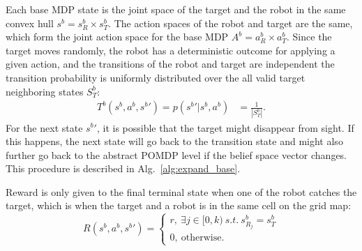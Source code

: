\documentclass[../main.tex]{subfiles}
\begin{document}
Each base MDP state is the joint space of the target and the robot in the same convex hull $s^b = s_R^b \times s_T^b$. The action spaces of the robot and target are the same, which form the joint action space for the base MDP $A^b = a_R^b \times a_T^b$. Since the target moves randomly, the robot has a deterministic outcome for applying a given action,
and the transitions of the robot and target are independent
the transition probability is uniformly distributed over the all valid target neighboring states $S_T^b$: 
\begin{equation}
\begin{aligned}
    T^b(s^b, a^b, {s^b}') = p({s^b}' | s^b, a^b)
    &= \frac{1}{|S_T^b|}.
\end{aligned}
\end{equation}
For the next state ${s^b}'$, it is possible that the target might disappear from sight. If this happens, the next state will go back to the transition state and might also further go back to the abstract POMDP level if the belief space vector changes. This procedure is described in Alg.~\ref{alg:expand_base}.

Reward is only given to the final terminal state when one of the robot catches the target, which is when the target and a robot is in the same cell on the grid map: 
\begin{equation}
R(s^b, a^b, {s^b} ') =
    \begin{cases}
    r, \ \exists j \in [0, k)\ s.t.\ s_{R_j}^b=s_T^b \\
    0, \ \text{otherwise.}
    \end{cases}
\end{equation}
\end{document}

